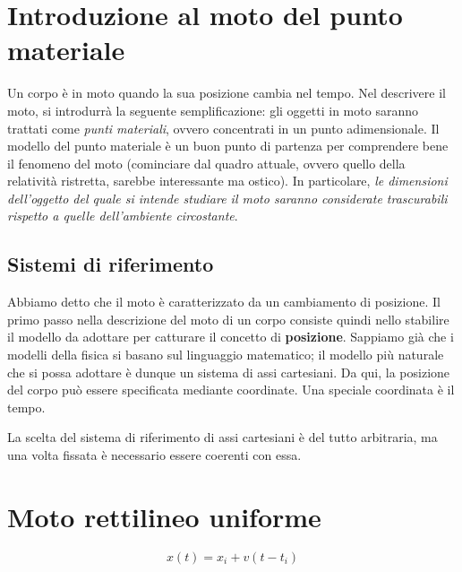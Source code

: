 


\section{Introduzione al moto del punto materiale}
Un corpo è in moto quando la sua posizione cambia nel tempo. Nel descrivere il
moto, si introdurrà la seguente semplificazione: gli oggetti in moto saranno
trattati come \textit{punti materiali}, ovvero concentrati in un punto
adimensionale. Il modello del punto materiale è un buon punto di partenza per
comprendere bene il fenomeno del moto (cominciare dal quadro attuale, ovvero
quello della relatività ristretta, sarebbe interessante ma ostico). In particolare,
\textit{le dimensioni dell'oggetto del quale si intende studiare il moto saranno
considerate trascurabili rispetto a quelle dell'ambiente circostante}.

\subsection{Sistemi di riferimento}
Abbiamo detto che il moto è caratterizzato da un cambiamento di posizione. Il primo
passo nella descrizione del moto di un corpo consiste quindi nello stabilire il
modello da adottare per catturare il concetto di \textbf{posizione}. Sappiamo già
che i modelli della fisica si basano sul linguaggio matematico; il modello più
naturale che si possa adottare è dunque un sistema di assi cartesiani. Da qui, la
posizione del corpo può essere specificata mediante coordinate. Una speciale
coordinata è il tempo.

La scelta del sistema di riferimento di assi cartesiani è del tutto arbitraria,
ma una volta fissata è necessario essere coerenti con essa.


\section{Moto rettilineo uniforme}
\[ x(t) = x_i + v(t - t_i)  \]